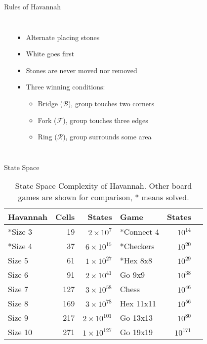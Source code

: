 \documentclass{beamer} %
\begin{document}
\begin{frame}{Rules of Havannah}
\begin{columns}
\begin{center}
\begin{HavannahBoard}[board size=6,coordinate style=classical]
\end{HavannahBoard}
\end{center}

\begin{itemize}
\item Alternate placing stones
\item White goes first
\item Stones are never moved nor removed
\item Three winning conditions:
	\begin{itemize}
		\item Bridge ($\mathcal B$), group touches two corners
		\item Fork ($\mathcal F$), group touches three edges
		\item Ring ($\mathcal R$), group surrounds some area
	\end{itemize}
\end{itemize}
\end{columns}
\end{frame}


\begin{frame}{State Space}
\begin{table}
	\centering
	\begin{tabular}{lrr|lrc}
	Havannah  & Cells & States              & Game       & States     \\ \hline
	*Size 3   &    19 & $2 \times 10^{7}$   & *Connect 4 & $10^{14}$  \\
	*Size 4   &    37 & $6 \times 10^{15}$  & *Checkers  & $10^{20}$  \\
	Size 5    &    61 & $1 \times 10^{27}$  & *Hex 8x8   & $10^{29}$  \\
	Size 6    &    91 & $2 \times 10^{41}$  & Go 9x9     & $10^{38}$  \\
	Size 7    &   127 & $3 \times 10^{58}$  & Chess      & $10^{46}$  \\
	Size 8    &   169 & $3 \times 10^{78}$  & Hex 11x11  & $10^{56}$  \\
	Size 9    &   217 & $2 \times 10^{101}$ & Go 13x13   & $10^{80}$  \\
	Size 10   &   271 & $1 \times 10^{127}$ & Go 19x19   & $10^{171}$ \\
	\end{tabular}
	\caption[State Space Complexity of Havannah]{State Space Complexity of Havannah. Other board games are shown for comparison, * means solved.}
	\label{table:complexity}
\end{table}
\end{frame}
\end{document}
